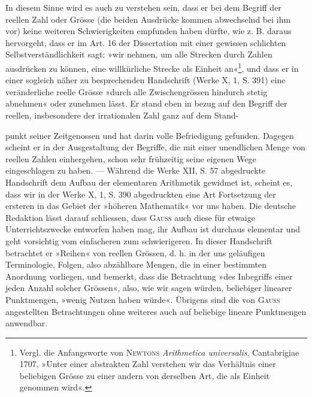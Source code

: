 In diesem Sinne wird es auch zu verstehen sein, dass er bei dem Begriff
der reellen Zahl oder Grösse (die beiden Ausdrücke kommen abwechselnd bei
ihm vor) keine weiteren Schwierigkeiten empfunden haben dürfte, wie z. B.
daraus hervorgeht, dass er im Art. 16 der Dissertation mit einer gewissen
schlichten Selbstverständlichkeit sagt: »wir nehmen, um alle Strecken durch
Zahlen ausdrücken zu können, eine willkürliche Strecke als Einheit an«\footnote{Vergl. die Anfangsworte von \textsc{Newtons} \textit{Arithmetica universalis}, Cantabrigiae 1707, »Unter einer
abstrakten Zahl verstehen wir das Verhältnis einer beliebigen Grösse zu einer andern von derselben Art, die
als Einheit genommen wird«.},
und dass er in einer sogleich näher zu besprechenden Handschrift (Werke
X, 1, S. 391) eine veränderliche reelle Grösse »durch alle Zwischengrössen
hindurch stetig abnehmen« oder zunehmen lässt. Er stand eben in bezug auf
den Begriff der reellen, insbesondere der irrationalen Zahl ganz auf dem Stand-\par
\clearpage{}
\noindent punkt seiner Zeitgenossen und hat darin volle Befriedigung gefunden. Dagegen
scheint er in der Ausgestaltung der Begriffe, die mit einer unendlichen
Menge von reellen Zahlen einhergehen, schon sehr frühzeitig seine eigenen
Wege eingeschlagen zu haben. — Während die Werke XII, S. 57 abgedruckte
Handschrift dem Aufbau der elementaren Arithmetik gewidmet ist, scheint
es, dass wir in der Werke X, 1, S. 390 abgedruckten eine Art Fortsetzung
der ersteren in das Gebiet der »höheren Mathematik« vor uns haben. Die
deutsche Redaktion lässt darauf schliessen, dass \textsc{Gauss} auch diese für etwaige
Unterrichtszwecke entworfen haben mag, ihr Aufbau ist durchaus elementar
und geht vorsichtig vom einfacheren zum schwierigeren. In dieser Handschrift
betrachtet er »Reihen« von reellen Grössen, d. h. in der uns geläufigen
Terminologie, Folgen, also abzählbare Mengen, die in einer bestimmten
Anordnung vorliegen, und bemerkt, dass die Betrachtung »des Inbegriffs einer
jeden Anzahl solcher Grössen«, also, wie wir sagen würden, beliebiger linearer
Punktmengen, »wenig Nutzen haben würde«. Übrigens sind die von \textsc{Gauss}
angestellten Betrachtungen ohne weiteres auch auf beliebige lineare Punktmengen
anwendbar.

